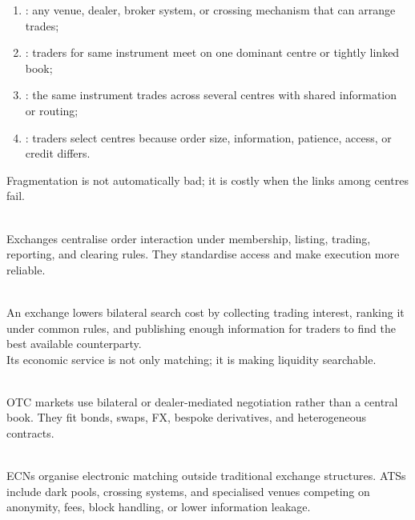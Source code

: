 \documentclass[a4paper,oneside,openany]{book}
\begin{document}
\begin{taxonomy} 
\begin{enumerate}[label=\roman*.]
\setlength{\itemsep}{0pt}
\item {}: any venue, dealer, broker system, or crossing mechanism that can arrange trades;
\item {}: traders for same instrument meet on one dominant centre or tightly linked book;
\item {}: the same instrument trades across several centres with shared information or routing;
\item {}: traders select centres because order size, information, patience, access, or credit differs.
\end{enumerate}
Fragmentation is not automatically bad; it is costly when the links among centres fail.
\end{taxonomy}

\begin{definition} \\
Exchanges centralise order interaction under membership, listing, trading, reporting, and clearing rules. They standardise access and make execution more reliable.
\end{definition}

\begin{mechanism} \\
An exchange lowers bilateral search cost by collecting trading interest, ranking it under common rules, and publishing enough information for traders to find the best available counterparty.\\
Its economic service is not only matching; it is making liquidity searchable.
\end{mechanism}

\begin{definition} \\
OTC markets use bilateral or dealer-mediated negotiation rather than a central book. They fit bonds, swaps, FX, bespoke derivatives, and heterogeneous contracts.
\end{definition}

\begin{taxonomy} \\
ECNs organise electronic matching outside traditional exchange structures. ATSs include dark pools, crossing systems, and specialised venues competing on anonymity, fees, block handling, or lower information leakage.
\end{taxonomy}
\end{document}
